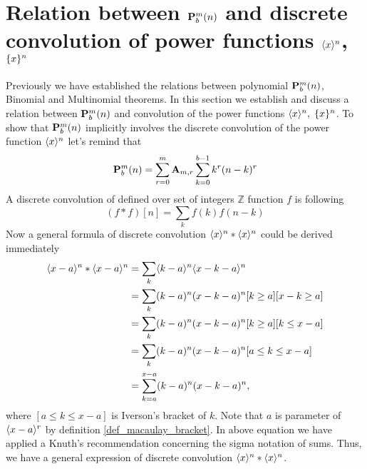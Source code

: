 \documentclass[12pt,letterpaper,oneside,reqno]{amsart}
\newcommand \anglePower [2]{\langle #1 \rangle \sp{#2}}
\newcommand \curvePower [2]{\{#1\}\sp{#2}}
\newcommand \coeffA [3][A] {{\mathbf{#1}} \sb{#2,#3}}
\newcommand \polynomialP [4][P]{{\mathbf{#1}}\sp{#2} \sb{#3}(#4)}
\numberwithin{equation}{section}
\begin{document}
    \section{Relation between \texorpdfstring{$\polynomialP{m}{b}{n}$}{P(m,b,n)} and discrete convolution
    of power functions \texorpdfstring{$\anglePower{x}{n}$}{<x to pow n>},
        \texorpdfstring{$\curvePower{x}{n}$}{\{x to pow n\}}}
    Previously we have established the relations between polynomial $\polynomialP{m}{b}{n}$, Binomial and Multinomial
    theorems.
    In this section we establish and discuss a relation between $\polynomialP{m}{b}{n}$ and convolution of the power
    functions $\anglePower{x}{n}, \; \curvePower{x}{n}$.
    To show that $\polynomialP{m}{b}{n}$ implicitly involves the discrete convolution of the
    power function $\anglePower{x}{n}$ let's remind that
    \begin{equation*}
        \polynomialP{m}{b}{n} = \sum_{r=0}^{m} \coeffA{m}{r} \sum_{k=0}^{b-1} k^r (n-k)^r
    \end{equation*}
    A discrete convolution of defined over set of integers $\mathbb{Z}$ function $f$ is following
    \begin{equation*}
        (f \ast f)[n] = \sum_{k} f(k) f(n-k)
    \end{equation*}
    Now a general formula of discrete convolution $\anglePower{x}{n} \ast \anglePower{x}{n}$ could be derived
    immediately
    \begin{equation*}
        \begin{split}
            \anglePower{x-a}{n} \ast \anglePower{x-a}{n}
            &=\sum_{k} \anglePower{k-a}{n} \anglePower{x-k-a}{n} \\
            &=\sum_{k} (k-a)^n (x-k-a)^n [k\geq a][x-k\geq a] \\
            &=\sum_{k} (k-a)^n (x-k-a)^n [k\geq a][k\leq x-a] \\
            &=\sum_{k} (k-a)^n (x-k-a)^n [a \leq k \leq x-a] \\
            &=\sum_{k=a}^{x-a} (k-a)^n (x-k-a)^n,
        \end{split}
    \end{equation*}
    where $[a \leq k \leq x-a]$ is Iverson's bracket of $k$.
    Note that $a$ is parameter of $\anglePower{x-a}{r}$ by definition \eqref{def_macaulay_bracket}.
    In above equation we have applied a Knuth's recommendation \cite{Knuth92} concerning the sigma notation of sums.
    Thus, we have a general expression of discrete convolution $\anglePower{x}{n} \ast \anglePower{x}{n}$.
\end{document}

